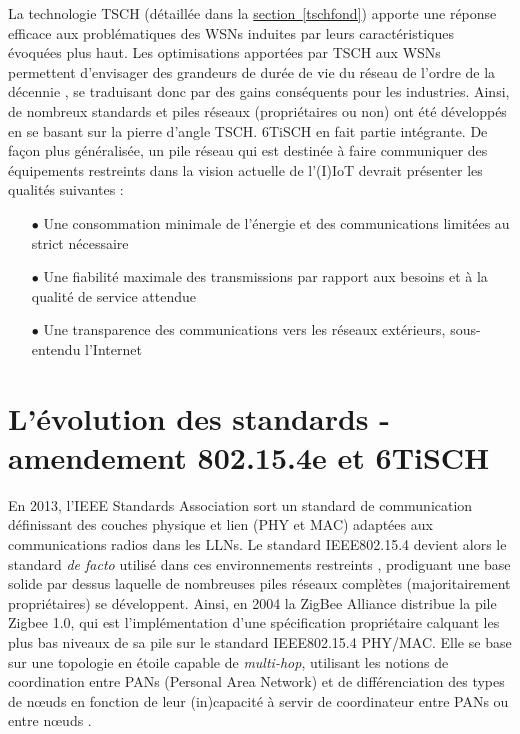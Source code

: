 \documentclass[]{report}
\newcommand{\wordlink}[2]{\hyperref[#2]{#1~\ref{#2}}}
\begin{document}
\par La technologie TSCH (détaillée dans la \wordlink{section}{tschfond}) apporte une réponse efficace aux problématiques des WSNs induites par leurs caractéristiques évoquées plus haut. Les optimisations apportées par TSCH aux WSNs permettent d'envisager des grandeurs de durée de vie du réseau de l'ordre de la décennie \cite{SODA}, se traduisant donc par des gains conséquents pour les industries. Ainsi, de nombreux standards et piles réseaux (propriétaires ou non) ont été développés en se basant sur la pierre d'angle TSCH. 6TiSCH en fait partie intégrante. De façon plus généralisée, un pile réseau qui est destinée à faire communiquer des équipements restreints dans la vision actuelle de l'(I)IoT devrait présenter les qualités suivantes \cite{stack-IoT} :\\
\begin{itemize}
\vspace{0.2cm}
\item[$\bullet$] Une consommation minimale de l'énergie et des communications limitées au strict nécessaire
\vspace{0.2cm}
\item[$\bullet$] Une fiabilité maximale des transmissions par rapport aux besoins et à la qualité de service attendue
\vspace{0.2cm}
\item[$\bullet$] Une transparence des communications vers les réseaux extérieurs, sous-entendu l'Internet \cite{6TiSCH-industrial-perf}
\end{itemize}

\newpage

\section{L'évolution des standards - amendement 802.15.4e et 6TiSCH}

En 2013, l'IEEE Standards Association sort un standard de communication définissant des couches physique et lien (PHY et MAC) adaptées aux communications radios dans les LLNs. Le standard IEEE802.15.4 devient alors le standard \textit{de facto} utilisé dans ces environnements restreints \cite{6top-perf}, prodiguant une base solide par dessus laquelle de nombreuses piles réseaux complètes (majoritairement propriétaires) se développent. Ainsi, en 2004 la ZigBee Alliance distribue la pile Zigbee 1.0, qui est l'implémentation d'une spécification propriétaire calquant les plus bas niveaux de sa pile sur le standard IEEE802.15.4 PHY/MAC. Elle se base sur une topologie en étoile capable de \textit{multi-hop}, utilisant les notions de coordination entre PANs (Personal Area Network) et de différenciation des types de nœuds en fonction de leur (in)capacité à servir de coordinateur entre PANs ou entre nœuds \cite{stack-IoT}.\\
\end{document}
